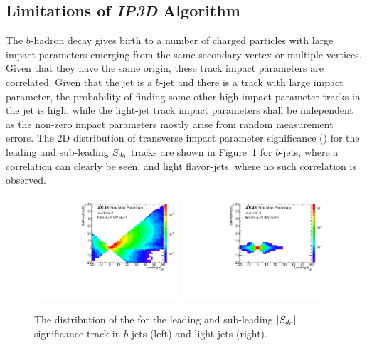 \subsection{Limitations of \textit{IP3D} Algorithm}

The $b$-hadron decay gives birth to a number of charged particles with large impact parameters emerging from the same secondary vertex or multiple vertices. Given that they have the same origin, these track impact parameters are correlated. Given that the jet is a $b$-jet and there is a track with large impact parameter, the probability of finding some other high impact parameter tracks in the jet is high, while the light-jet track impact parameters shall be independent as the non-zero impact parameters mostly arise from random measurement errors. The 2D distribution of transverse impact parameter significance (\sdip) for the leading and sub-leading $S_{d{_0}}$ tracks are shown in Figure~\ref{fig:ip_corr} for $b$-jets, where a correlation can clearly be seen, and light flavor-jets, where no such correlation is observed.

\begin{figure}[htbp]
  \centering
   \includegraphics[width=0.48\textwidth]{figures/RNN/Sd0_2d_B.pdf}
 \includegraphics[width=0.48\textwidth]{figures/RNN/Sd0_2d_L.pdf}
\caption{The distribution of the \sdip for the leading and sub-leading $|S_{d{_0}}|$ significance track in $b$-jets (left) and light jets (right). }
  \label{fig:ip_corr}
\end{figure}


